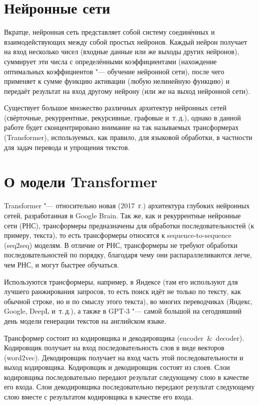 \section{Нейронные сети}


Вкратце, нейронная сеть представляет собой систему соединённых и взаимодействующих между собой простых нейронов. Каждый нейрон получает на вход несколько чисел (входные данные или же выходы других нейронов), суммирует эти числа с определёнными коэффициентами (нахождение оптимальных коэффициентов "--- обучение нейронной сети), после чего применяет к сумме функцию активации (любую нелинейную функцию) и передаёт результат на вход другому нейрону (или же на выход нейронной сети).

Существует большое множество различных архитектур нейронных сетей (свёрточные, рекуррентные, рекурсивные, графовые и~т.\,д.), однако в данной работе будет сконцентрировано внимание на так называемых трансформерах (Transformer), используемых, как правило, для языковой обработки, в частности для задач перевода и упрощения текстов.


\section{О модели Transformer}


Transformer "--- относительно новая (2017~г.) архитектура глубоких нейронных сетей, разработанная в Google Brain.
Так же, как и рекуррентные нейронные сети (РНС), трансформеры предназначены для обработки последовательностей (к примеру, текста), то есть трансформеры относятся к sequence-to-sequence (seq2seq) моделям. В отличие от РНС, трансформеры не требуют обработки последовательностей по порядку, благодаря чему они распараллеливаются легче, чем РНС, и могут быстрее обучаться.

Используются трансформеры, например, в Яндексе (там его используют для лучшего ранжирования запросов, то есть поиск идёт не только по тексту, как обычной строке, но и по смыслу этого текста), во многих переводчиках (Яндекс, Google, DeepL и~т.\,д.), а также в GPT-3 "--- самой большой на сегодняшний день модели генерации текстов на английском языке.

% 
% 
% 
Трансформер состоит из кодировщика и декодировщика (encoder~\&~decoder). Кодировщик получает на вход последовательность слов в виде векторов (word2vec). Декодировщик получает на вход часть этой последовательности и выход кодировщика. Кодировщик и декодировщик состоят из слоев. Слои кодировщика последовательно передают результат следующему слою в качестве его входа. Слои декодировщика последовательно передают результат следующему слою вместе с результатом кодировщика в качестве его входа.

